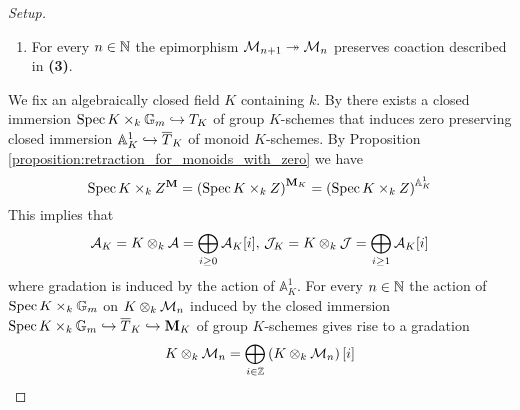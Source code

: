 \begin{proof}[Setup]
\begin{enumerate}[label=\textbf{(\arabic*)}, leftmargin=3.0em]
\item For every $n\in {\mathbb N}$ the epimorphism ${\mathcal M}_{n+1} \twoheadrightarrow {\mathcal M}_n$ preserves coaction described in \textbf{(3)}.
\end{enumerate}
We fix an algebraically closed field $K$ containing $k$. By {\cite[Corollary 3.7]{Algebraic_monoids}} there exists a closed immersion $\mathrm{Spec}\, K\times_k \mathbb{G}_m\hookrightarrow T_K$ of group $K$-schemes that induces zero preserving closed immersion $\mathbb{A}^1_K\hookrightarrow \overline{T}_K$ of monoid $K$-schemes. By Proposition \ref{proposition:retraction_for_monoids_with_zero} we have
$$\mathrm{Spec}\, K\times_k Z^{\mathbf{M}} = \left(\mathrm{Spec}\, K\times_k Z\right)^{\mathbf{M}_K} = \left(\mathrm{Spec}\, K\times_k Z\right)^{\mathbb{A}^1_K}$$
This implies that
$${\mathcal A}_K = K\otimes_k{\mathcal A} = \bigoplus_{i\geq 0}{\mathcal A}_K[i],\,{\mathcal J}_K = K\otimes_k{\mathcal J} = \bigoplus_{i\geq 1}{\mathcal A}_K[i]$$
where gradation is induced by the action of $\mathbb{A}^1_K$. For every $n\in {\mathbb N}$ the action of $\mathrm{Spec}\, K\times_k \mathbb{G}_m$ on $K\otimes_k{\mathcal M}_n$ induced by the closed immersion $\mathrm{Spec}\, K\times_k \mathbb{G}_m \hookrightarrow \overline{T}_K\hookrightarrow \mathbf{M}_K$ of group $K$-schemes gives rise to a gradation
$$K\otimes_k{\mathcal M}_n = \bigoplus_{i\in {\mathbb Z}}\left(K\otimes_k{\mathcal M}_n\right)[i]$$
\end{proof}


